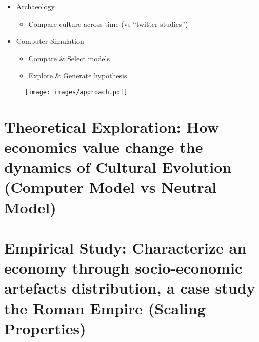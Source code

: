 \documentclass[a4paper]{article}
\begin{document}
\begin{itemize}
    \item Archaeology
	\begin{itemize}
	    \item Compare culture across time (vs ``twitter studies'')
	\end{itemize}
	\vfill
    \item Computer Simulation
	\begin{itemize}
	    \item Compare \& Select models
	    \item Explore \& Generate hypothesis
	\end{itemize}
\end{itemize}
%
\begin{figure}
    \texttt{[image: images/approach.pdf]}		
\end{figure}
%    
%
%    
%

\section{Theoretical Exploration: How economics value change the dynamics of Cultural Evolution (Computer Model vs Neutral Model) }
\section{ Empirical Study:  Characterize an economy through socio-economic artefacts distribution, a case study the Roman Empire (Scaling Properties)}
\end{document}
